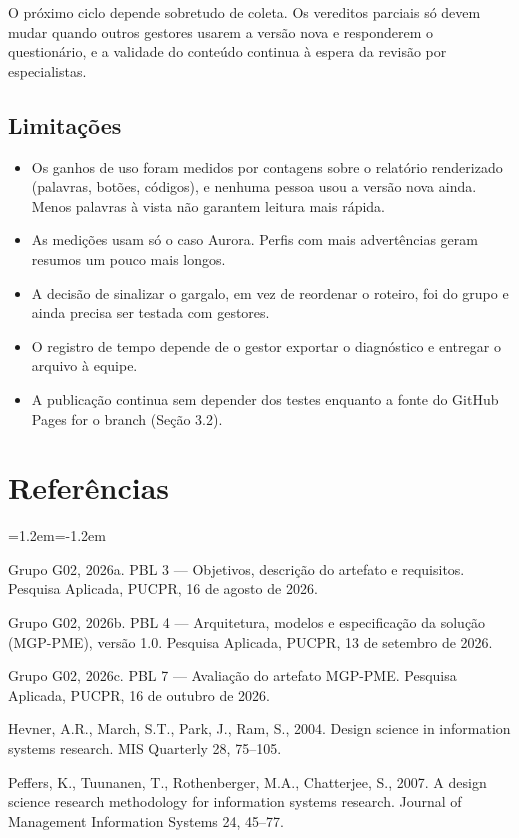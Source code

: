 \documentclass[11pt,a4paper]{article}
\begin{document}
O próximo ciclo depende sobretudo de coleta. Os vereditos parciais só devem mudar quando outros gestores usarem a
versão nova e responderem o questionário, e a validade do conteúdo continua à espera da revisão por especialistas.

\subsection{Limitações}
\begin{itemize}
  \item Os ganhos de uso foram medidos por contagens sobre o relatório renderizado (palavras, botões, códigos), e
        nenhuma pessoa usou a versão nova ainda. Menos palavras à vista não garantem leitura mais rápida.
  \item As medições usam só o caso Aurora. Perfis com mais advertências geram resumos um pouco mais longos.
  \item A decisão de sinalizar o gargalo, em vez de reordenar o roteiro, foi do grupo e ainda precisa ser testada com
        gestores.
  \item O registro de tempo depende de o gestor exportar o diagnóstico e entregar o arquivo à equipe.
  \item A publicação continua sem depender dos testes enquanto a fonte do GitHub Pages for o branch (Seção 3.2).
\end{itemize}

\section*{Referências}
\begin{list}{}{\leftmargin=1.2em\itemindent=-1.2em\itemsep=3pt\parsep=0pt}
\item Grupo G02, 2026a. PBL 3 --- Objetivos, descrição do artefato e requisitos. Pesquisa Aplicada, PUCPR, 16 de agosto de 2026.
\item Grupo G02, 2026b. PBL 4 --- Arquitetura, modelos e especificação da solução (MGP-PME), versão 1.0. Pesquisa Aplicada, PUCPR, 13 de setembro de 2026.
\item Grupo G02, 2026c. PBL 7 --- Avaliação do artefato MGP-PME. Pesquisa Aplicada, PUCPR, 16 de outubro de 2026.
\item Hevner, A.R., March, S.T., Park, J., Ram, S., 2004. Design science in information systems research. MIS Quarterly 28, 75--105.
\item Peffers, K., Tuunanen, T., Rothenberger, M.A., Chatterjee, S., 2007. A design science research methodology for information systems research. Journal of Management Information Systems 24, 45--77.
\end{list}
\end{document}
